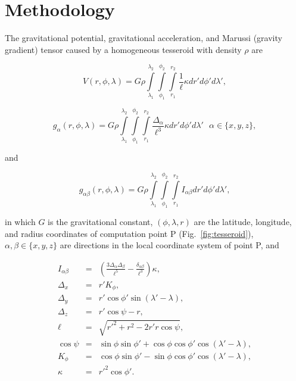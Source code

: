 \section{Methodology}

The gravitational potential,
gravitational acceleration,
and Marussi (gravity gradient) tensor
caused by a homogeneous tesseroid
with density $\rho$
are \citep{Grombein2013}

\begin{equation}
    V(r,\phi,\lambda) = G \rho
        \int\limits_{\lambda_1}^{\lambda_2}
        \int\limits_{\phi_1}^{\phi_2}
        \int\limits_{r_1}^{r_2}
        \frac{1}{\ell} \kappa  dr' d\phi' d\lambda',
    \label{eq:tesspot}
\end{equation}

\begin{equation}
    g_{\alpha}(r,\phi,\lambda) = G \rho
        \int\limits_{\lambda_1}^{\lambda_2}
        \int\limits_{\phi_1}^{\phi_2}
        \int\limits_{r_1}^{r_2}
        \frac{\Delta_{\alpha}}{\ell^3} \kappa dr' d\phi' d\lambda'
        \ \ \ \alpha \in \{x,y,z\},
    \label{eq:tessgrav}
\end{equation}

\noindent
and

\begin{equation}
    g_{\alpha\beta}(r,\phi,\lambda) = G \rho
        \int\limits_{\lambda_1}^{\lambda_2}
        \int\limits_{\phi_1}^{\phi_2}
        \int\limits_{r_1}^{r_2}
        I_{\alpha\beta}
        dr' d\phi' d\lambda',
    \label{eq:tesstensor}
\end{equation}

\noindent
in which
$G$ is the gravitational constant,
$(\phi, \lambda, r)$ are
the latitude, longitude, and radius
coordinates of computation point P (Fig.~\ref{fig:tesseroid}),
$\alpha,\beta \in \{x,y,z\}$
are directions in the local coordinate system of point P,
and

\begin{eqnarray}
    I_{\alpha\beta} &=&
        \left(
            \frac{3\Delta_{\alpha} \Delta_{\beta}}{\ell^5} -
            \frac{\delta_{\alpha\beta}}{\ell^3}
        \right) \kappa, \\
    \Delta_x &=& r' K_{\phi} , \\
    \Delta_y &=& r' \cos \phi' \sin(\lambda' - \lambda) , \\
    \Delta_z &=& r' \cos \psi - r, \\
    \ell &=& \sqrt{r'^2 + r^2 - 2 r' r \cos \psi} , \\
    \cos\psi &=& \sin\phi\sin\phi' + \cos\phi\cos\phi'
                 \cos(\lambda' - \lambda) , \\
    K_{\phi} &=& \cos\phi\sin\phi' - \sin\phi\cos\phi'
                 \cos(\lambda' - \lambda), \\
    \kappa &=& {r'}^2 \cos \phi'.
\end{eqnarray}

